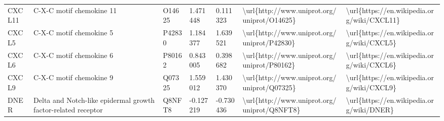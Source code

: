 \begin{table}[]
\begin{tabular}{lllllll}
\multicolumn{1}{l|}{CXCL11}   & C-X-C motif chemokine 11                                      & O14625  & 1.471448           & 0.111323          & \textbackslash{}url\{http://www.uniprot.org/uniprot/O14625\} & \textbackslash{}url\{https://en.wikipedia.org/wiki/CXCL11\}                                                                                                                                                                                                                                        \\
\multicolumn{1}{l|}{CXCL5}    & C-X-C motif chemokine 5                                       & P42830  & 1.184377           & 1.639521          & \textbackslash{}url\{http://www.uniprot.org/uniprot/P42830\} & \textbackslash{}url\{https://en.wikipedia.org/wiki/CXCL5\}                                                                                                                                                                                                                                         \\
\multicolumn{1}{l|}{CXCL6}    & C-X-C motif chemokine 6                                       & P80162  & 0.843005           & 0.398682          & \textbackslash{}url\{http://www.uniprot.org/uniprot/P80162\} & \textbackslash{}url\{https://en.wikipedia.org/wiki/CXCL6\}                                                                                                                                                                                                                                         \\
\multicolumn{1}{l|}{CXCL9}    & C-X-C motif chemokine 9                                       & Q07325  & 1.559012           & 1.430370          & \textbackslash{}url\{http://www.uniprot.org/uniprot/Q07325\} & \textbackslash{}url\{https://en.wikipedia.org/wiki/CXCL9\}                                                                                                                                                                                                                                         \\
\multicolumn{1}{l|}{DNER}     & Delta and Notch-like epidermal growth factor-related receptor & Q8NFT8  & -0.127219          & -0.730436         & \textbackslash{}url\{http://www.uniprot.org/uniprot/Q8NFT8\} & \textbackslash{}url\{https://en.wikipedia.org/wiki/DNER\}                                                                                                                                                                                                                                          \\

\end{tabular}
\end{table}
